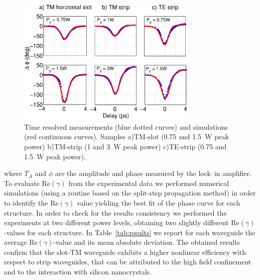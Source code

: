 \documentclass[10pt,letterpaper]{article}
\begin{document}
\begin{figure}[htb]
  \centering
  \includegraphics[width=0.77\textwidth]{measurements_v9} %
  \caption{Time resolved measurements (blue dotted curves) and simulations (red continuous curves). Samples a)TM-slot (0.75 and 1.5~W peak power) b)TM-strip (1 and 3~W peak power) c)TE-strip (0.75 and 1.5~W peak power).}
  \label{fig:timeResolvesMeasurements}
\end{figure}

where $T_A$ and $\phi$ are the amplitude and phase measured by the lock--in amplifier.
To evaluate Re$(\gamma)$ from the experimental data we performed numerical simulations (using a routine based on the split-step propagation method) in order to identify the Re$(\gamma)$ value yielding the best fit of the phase curve for each structure. In order to check for the results consistency we performed the experiments at two different power levels, obtaining two slightly different Re$(\gamma)$-values for each structure. In Table~\ref{tab:results} we report for each waveguide the average Re$(\gamma)$-value and its mean absolute deviation. 
The obtained results confirm that the slot-TM waveguide exhibits a higher nonlinear efficiency with respect to strip waveguides, that can be attributed to the high field confinement and to the interaction with silicon nanocrystals.
\end{document}
